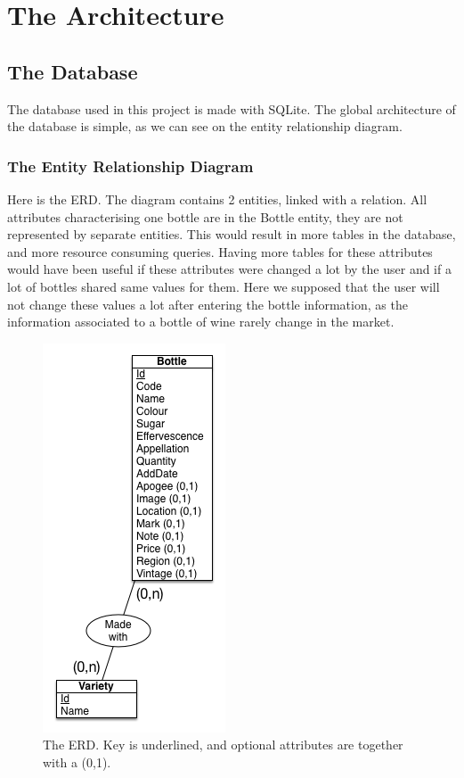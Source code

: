 

\section{The Architecture}

\subsection{The Database}

The database used in this project is made with SQLite. The global architecture of the database is simple, as we can see on the entity relationship diagram.

\subsubsection{The Entity Relationship Diagram}

Here is the ERD. The diagram contains 2 entities, linked with a relation. All attributes characterising one bottle are in the Bottle entity, they are not represented by separate entities. This would result in more tables in the database, and more resource consuming queries. Having more tables for these attributes would have been useful if these attributes were changed a lot by the user and if a lot of bottles shared same values for them. Here we supposed that the user will not change these values a lot after entering the bottle information, as the information associated to a bottle of wine rarely change in the market.

\begin{figure}[H]
\begin{center}
	\includegraphics[scale=0.7]{../Entity Relationship DB diagram.png}
	\caption{The ERD. Key is underlined, and optional attributes are together with a (0,1).}
\end{center}
\end{figure}

